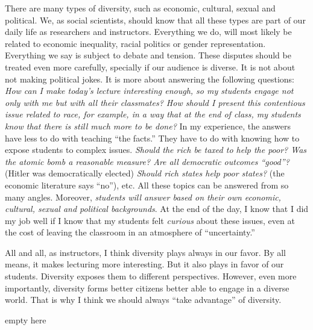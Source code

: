 \documentclass[11pt]{letter} %
\begin{document}
\begin{letter}{}
There are many types of diversity, such as economic, cultural, sexual and political. We, as social scientists, should know that all these types are part of our daily life as researchers and instructors. Everything we do, will most likely be related to economic inequality, racial politics or gender representation. Everything we say is subject to debate and tension. These disputes should be treated even more carefully, specially if our audience is diverse. It is not about not making political jokes. It is more about answering the following questions: \emph{How can I make today's lecture interesting enough, so my students engage not only with me but with all their classmates? How should I present this contentious issue related to race, for example, in a way that at the end of class, my students know that there is still much more to be done?} In my experience, the answers have less to do with teaching ``the facts.'' They have to do with knowing how to expose students to complex issues. \emph{Should the rich be taxed to help the poor? Was the atomic bomb a reasonable measure? Are all democratic outcomes ``good''?} (Hitler was democratically elected) \emph{Should rich states help poor states?} (the economic literature says ``no''), etc. All these topics can be answered from so many angles. Moreover, \emph{students will answer based on their own economic, cultural, sexual and political backgrounds}. At the end of the day, I know that I did my job well if I know that my students felt \emph{curious} about these issues, even at the cost of leaving the classroom in an atmosphere of ``uncertainty.''

All and all, as instructors, I think diversity plays always in our favor. By all means, it makes lecturing more interesting. But it also plays in favor of our  students. Diversity exposes them to different perspectives. However, even more importantly, diversity forms better citizens better able to engage in a diverse world. That is why I think we should always ``take advantage'' of diversity.



\closing{{\color{white}empty here}}




\end{letter}
\end{document}
